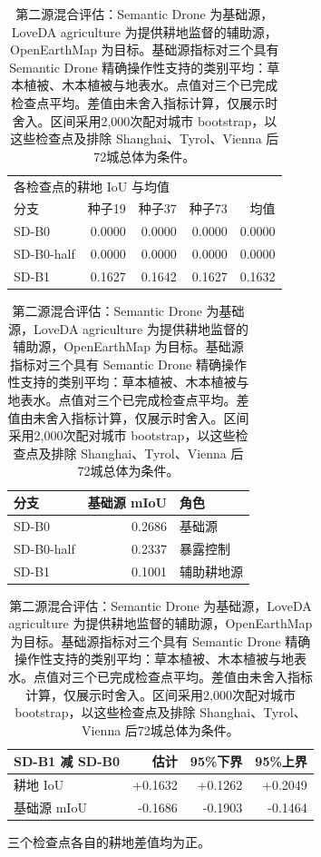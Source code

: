 \begin{table}[H]
\centering
\caption{第二源混合评估：Semantic Drone 为基础源，LoveDA agriculture 为提供耕地监督的辅助源，OpenEarthMap 为目标。基础源指标对三个具有 Semantic Drone 精确操作性支持的类别平均：草本植被、木本植被与地表水。点值对三个已完成检查点平均。差值由未舍入指标计算，仅展示时舍入。区间采用2,000次配对城市 bootstrap，以这些检查点及排除 Shanghai、Tyrol、Vienna 后72城总体为条件。}
\label{tab:second-mixture}
\small
\renewcommand{\arraystretch}{1.12}
\setlength{\tabcolsep}{4pt}
\begin{tabular*}{\linewidth}{@{\extracolsep{\fill}}lrrrr@{}}
\toprule
\multicolumn{5}{l}{各检查点的耕地 IoU 与均值} \\
分支 & 种子19 & 种子37 & 种子73 & 均值 \\
\midrule
SD-B0 & 0.0000 & 0.0000 & 0.0000 & 0.0000 \\
SD-B0-half & 0.0000 & 0.0000 & 0.0000 & 0.0000 \\
SD-B1 & 0.1627 & 0.1642 & 0.1627 & 0.1632 \\
\bottomrule
\end{tabular*}
\par\medskip
\begin{tabular*}{\linewidth}{@{\extracolsep{\fill}}lrl@{}}
\toprule
分支 & 基础源 mIoU & 角色 \\
\midrule
SD-B0 & 0.2686 & 基础源 \\
SD-B0-half & 0.2337 & 暴露控制 \\
SD-B1 & 0.1001 & 辅助耕地源 \\
\bottomrule
\end{tabular*}
\par\medskip
\begin{tabular*}{\linewidth}{@{\extracolsep{\fill}}lrrr@{}}
\toprule
SD-B1 减 SD-B0 & 估计 & 95\%下界 & 95\%上界 \\
\midrule
耕地 IoU & +0.1632 & +0.1262 & +0.2049 \\
基础源 mIoU & -0.1686 & -0.1903 & -0.1464 \\
\bottomrule
\end{tabular*}
\par\smallskip
\raggedright 三个检查点各自的耕地差值均为正。
\end{table}
